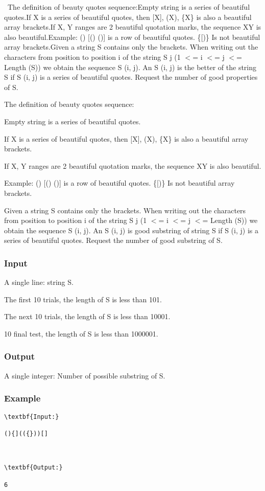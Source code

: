 

 The definition of beauty quotes sequence:Empty string is a series of beautiful quotes.If X is a series of beautiful quotes, then [X], (X), \{X\} is also a beautiful array brackets.If X, Y ranges are 2 beautiful quotation marks, the sequence XY is also beautiful.Example: () [() ()] is a row of beautiful quotes. \{[)\} Is not beautiful array brackets.Given a string S contains only the brackets. When writing out the characters from position to position i of the string S j (1 $<$= i $<$= j $<$= Length (S)) we obtain the sequence S (i, j). An S (i, j) is the better of the string S if S (i, j) is a series of beautiful quotes. Request the number of good properties of S.

The definition of beauty quotes sequence:

Empty string is a series of beautiful quotes.

If X is a series of beautiful quotes, then [X], (X), \{X\} is also a beautiful array brackets.

If X, Y ranges are 2 beautiful quotation marks, the sequence XY is also beautiful.

Example: () [() ()] is a row of beautiful quotes. \{[)\} Is not beautiful array brackets.

Given a string S contains only the brackets. When writing out the characters from position to position i of the string S j (1 $<$= i $<$= j $<$= Length (S)) we obtain the sequence S (i, j). An S (i, j) is good substring of string S if S (i, j) is a series of beautiful quotes. Request the number of good substring of S.

\subsubsection{Input}

A single line: string S.

The first 10 trials, the length of S is less than 101.

The next 10 trials, the length of S is less than 10001.

10 final test, the length of S is less than 1000001.

\subsubsection{Output}

A single integer: Number of possible substring of S.

\subsubsection{Example}
\begin{verbatim}
\textbf{Input:}

(){](({}))[]



\textbf{Output:}

6\end{verbatim}